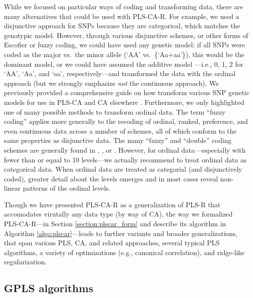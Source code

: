 \documentclass[12pt]{article}
\begin{document}
While we focused on particular ways of coding and transforming data,
there are many alternatives that could be used with PLS-CA-R. For
example, we used a disjunctive approach for SNPs because they are
categorical, which matches the genotypic model. However, through various
disjunctive schemes, or other forms of Escofier or fuzzy coding, we
could have used any genetic model: if all SNPs were coded as the major
vs.~the minor allele (`AA' vs.~\{`Aa+aa'\}), this would be the dominant
model, or we could have assumed the additive model ---i.e., 0, 1, 2 for
`AA', `Aa', and `aa', respectively---and transformed the data with the
ordinal approach (but we strongly emphasize \emph{not} the continuous
approach). We previously provided a comprehensive guide on how transform
various SNP genetic models for use in PLS-CA and CA elsewhere \citep[see
Appendix of][]{beaton_partial_2016}. Furthermore, we only highlighted
one of many possible methods to transform ordinal data. The term ``fuzzy
coding'' applies more generally to the recoding of ordinal, ranked,
preference, and even continuous data across a number of schemes, all of
which conform to the same properties as disjunctive data. The many
``fuzzy'' and ``double'' coding schemes are generally found in
\citet{escofier_traitement_1979}, \citet{lebart_multivariate_1984}, or
\citet{greenacrefuzzy}. However, for ordinal data---especially with
fewer than or equal to 10 levels---we actually recommend to treat
ordinal data as categorical data. When ordinal data are treated as
categorial (and disjunctively coded), greater detail about the levels
emerges and in most cases reveal non-linear patterns of the ordinal
levels.

Though we have presented PLS-CA-R as a generalization of PLS-R that
accomodates virutally any data type (by way of CA), the way we
formalized PLS-CA-R---in Section \ref{section:plscar_form} and describe
its algorithm in Algorithm \ref{algo:plscar}---leads to further variants
and broader generalizations, that span various PLS, CA, and related
approaches, several typical PLS algorithms, a variety of optimizations
(e.g., canonical correlation), and ridge-like regularization.

\hypertarget{gpls-algorithms}{%
\subsection{GPLS algorithms}\label{gpls-algorithms}}
\end{document}
